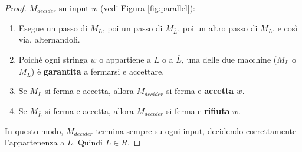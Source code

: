 \documentclass[a4paper]{article}
\theoremstyle{remark} %
\begin{document}
\begin{proof}
$M_{decider}$ su input $w$ (vedi Figura \ref{fig:parallel}):
\begin{enumerate}
    \item Esegue un passo di $M_L$, poi un passo di $M_{\overline{L}}$, poi un altro passo di $M_L$, e così via, alternandoli.
    \item Poiché ogni stringa $w$ o appartiene a $L$ o a $\overline{L}$, una delle due macchine ($M_L$ o $M_{\overline{L}}$) è \textbf{garantita} a fermarsi e accettare.
    \item Se $M_L$ si ferma e accetta, allora $M_{decider}$ si ferma e \textbf{accetta} $w$.
    \item Se $M_{\overline{L}}$ si ferma e accetta, allora $M_{decider}$ si ferma e \textbf{rifiuta} $w$.
\end{enumerate}
In questo modo, $M_{decider}$ termina sempre su ogni input, decidendo correttamente l'appartenenza a $L$. Quindi $L \in R$.
\end{proof}
\end{document}
